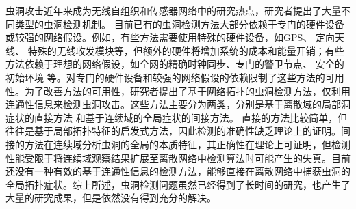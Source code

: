 虫洞攻击近年来成为无线自组织和传感器网络中的研究热点，研究者提出了大量不同类型的虫洞检测机制。
目前已有的虫洞检测方法大部分依赖于专门的硬件设备或较强的网络假设。例如，有些方法需要使用特殊的硬件设备，如GPS、 定向天线、 特殊的无线收发模块等，但额外的硬件将增加系统的成本和能量开销；有些方法依赖于理想的网络假设，如全网的精确时钟同步、专门的警卫节点、 安全的初始环境 等。对专门的硬件设备和较强的网络假设的依赖限制了这些方法的可用性。为了改善方法的可用性，研究者提出了基于网络拓扑的虫洞检测方法，仅利用连通性信息来检测虫洞攻击。这些方法主要分为两类，分别是基于离散域的局部洞症状的直接方法 和基于连续域的全局症状的间接方法。 直接的方法比较简单，但往往是基于局部拓扑特征的启发式方法，因此检测的准确性缺乏理论上的证明。间接的方法在连续域分析虫洞的全局的本质特征，其正确性在理论上可证明，但检测性能受限于将连续域观察结果扩展至离散网络中检测算法时可能产生的失真。目前还没有一种有效的基于连通性信息的检测方法，能够直接在离散网络中捕获虫洞的全局拓扑症状。综上所述，虫洞检测问题虽然已经得到了长时间的研究，也产生了大量的研究成果，但是依然没有得到充分的解决。

